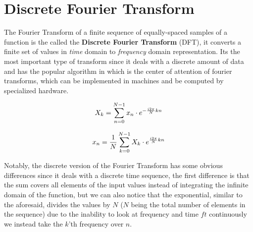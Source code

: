 \documentclass[
  oneside,
  11pt, a4paper,
  footinclude=true,
  headinclude=true,
  cleardoublepage=empty
]{scrbook}
\newcommand{\eqname}[1]{\tag*{#1}}%
\begin{document}



\section{Discrete Fourier Transform} \label{sec:discrete-fourier-transform}

The Fourier Transform of a finite sequence of equally-spaced samples of a function is the called the \textbf{Discrete Fourier Transform} (DFT), it converts a finite set of values in \textit{time} domain to \textit{frequency} domain representation. Its the most important type of transform since it deals with a discrete amount of data and has the popular algorithm in which is the center of attention of fourier transforms, which can be implemented in machines and be computed by specialized hardware.

\begin{equation} \label{eq3}
    X_{k} = \sum_{n=0}^{N-1}x_{n} \cdot e^{- \frac{i 2 \pi}{N}kn} \\ %
\end{equation}

\begin{equation} \label{eq4}
    x_{n} = \frac{1}{N} \sum_{k=0}^{N-1}X_{k} \cdot e^{\frac{i 2 \pi}{N}kn} \\ %
\end{equation}

Notably, the discrete version of the Fourier Transform has some obvious differences since it deals with a discrete time sequence, the first difference is that the sum covers all elements of the input values instead of integrating the infinite domain of the function, but we can also notice that the exponential, similar to the aforesaid, divides the values by \(N\) (\(N\) being the total number of elements in the sequence) due to the inability to look at frequency and time \(ft\) continuously we instead take the \(k\)'th frequency over \(n\).
\end{document}
